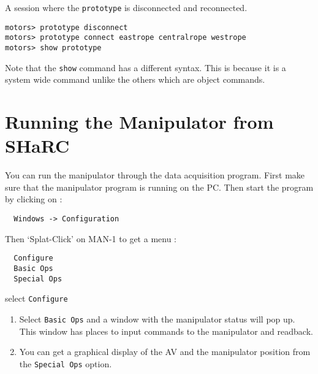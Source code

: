 A session where the {\tt prototype} is disconnected and reconnected.
\begin{verbatim}
motors> prototype disconnect
motors> prototype connect eastrope centralrope westrope
motors> show prototype
\end{verbatim}
Note that the {\tt show} command has a different syntax.  This is because
it is a system wide command unlike the others which are object commands.
  

  
  
\newpage
\section{Running the Manipulator from SHaRC}
  
You can run the manipulator through the data acquisition program.  First
make sure that the manipulator program is running on the PC. Then start
the program by clicking on :
\begin{verbatim}
  Windows -> Configuration 
\end{verbatim}
Then `Splat-Click' on MAN-1 to get a menu :
\begin{verbatim}
  Configure
  Basic Ops
  Special Ops
  \end{verbatim}
  select {\tt Configure}

\begin{enumerate}
\item Select {\tt Basic Ops} and a window with the manipulator status
  will pop up.  This window has places to input commands to the manipulator
  and readback.
\item You can get a graphical display of the AV and the manipulator
  position from the {\tt Special Ops} option.

\end{enumerate}

  



